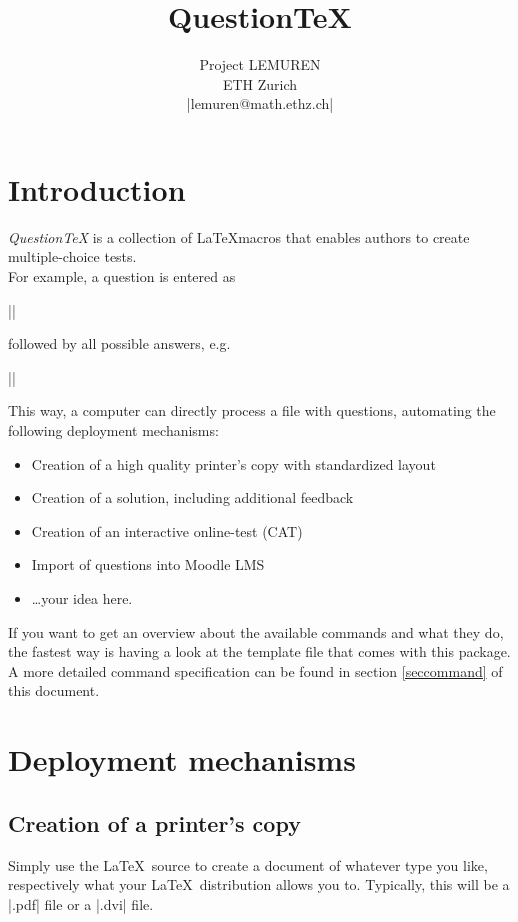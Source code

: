 \documentclass[a4paper,10pt]{ltxdoc}
\title{QuestionTeX}
\author{Project LEMUREN\\ETH Zurich\\|lemuren@math.ethz.ch|}
\begin{document}
\reversemarginpar

\maketitle
\tableofcontents
\newpage

\section{Introduction}
\emph{QuestionTeX} is a collection of \LaTeX\-macros that enables authors to
create multiple-choice tests.\\
For example, a question is entered as
\begin{center}
  ||
\end{center}
 followed by all possible answers, e.g.
\begin{center}
  ||
\end{center}
This way, a computer can directly process a file with questions,
automating the following deployment mechanisms:
\begin{itemize}
  \item Creation of a high quality printer's copy with standardized
  layout
  \item Creation of a solution, including additional feedback
  \item Creation of an interactive online-test (CAT)
  \item Import of questions into Moodle LMS
  \item \ldots your idea here.
\end{itemize}

If you want to get an overview about the available commands and what they
do, the fastest way is having a look at the template file that comes with
this package. A more detailed command specification can be found in section
\ref{seccommand} of this document.

\section{Deployment mechanisms}

\subsection{Creation of a printer's copy}
Simply use the \LaTeX\ source to create a document of whatever type you like,
respectively what your \LaTeX\ distribution allows you to. Typically, this will
be a |.pdf| file or a |.dvi| file.
\end{document}
